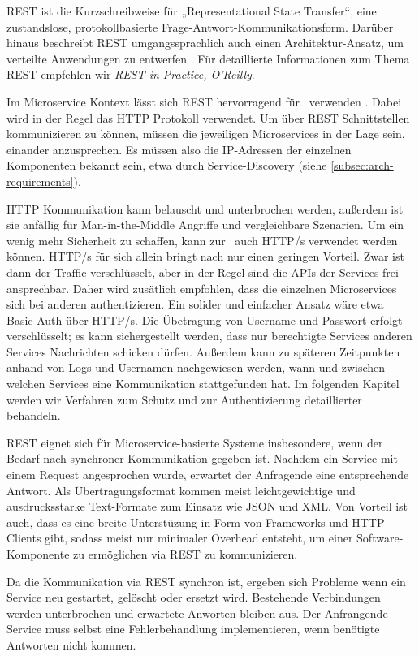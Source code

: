 REST ist die Kurzschreibweise für „Representational State Transfer“, eine zustandslose, protokollbasierte Frage-Antwort-Kommunikationsform. Darüber hinaus beschreibt REST umgangssprachlich auch einen Architektur-Ansatz, um verteilte Anwendungen zu entwerfen \cite{webber2010}. Für detaillierte Informationen zum Thema REST empfehlen wir \textit{REST in Practice, O'Reilly}.

Im Microservice Kontext lässt sich REST hervorragend für \stscom\ verwenden \cite{Fowler+14}. Dabei wird in der Regel das HTTP Protokoll verwendet. Um über REST Schnittstellen kommunizieren zu können, müssen die jeweiligen Microservices in der Lage sein, einander anzusprechen. Es müssen also die IP-Adressen der einzelnen Komponenten bekannt sein, etwa durch Service-Discovery (siehe \ref{subsec:arch-requirements}). 

HTTP Kommunikation kann belauscht und unterbrochen werden, außerdem ist sie anfällig für Man-in-the-Middle Angriffe und vergleichbare Szenarien. Um ein wenig mehr Sicherheit zu schaffen, kann zur \stscom\ auch HTTP/s verwendet werden können. HTTP/s für sich allein bringt nach \cite{newman2015} nur einen geringen Vorteil. Zwar ist dann der Traffic verschlüsselt, aber in der Regel sind die APIs der Services frei ansprechbar. Daher wird zusätlich empfohlen, dass die einzelnen Microservices sich bei anderen authentizieren. Ein solider und einfacher Ansatz wäre etwa Basic-Auth über HTTP/s. Die Übetragung von Username und Passwort erfolgt verschlüsselt; es kann sichergestellt werden, dass nur berechtigte Services anderen Services Nachrichten schicken dürfen. Außerdem kann zu späteren Zeitpunkten anhand von Logs und Usernamen nachgewiesen werden, wann und zwischen welchen Services eine Kommunikation stattgefunden hat. Im folgenden Kapitel werden wir Verfahren zum Schutz und zur Authentizierung detaillierter behandeln. 

REST eignet sich für Microservice-basierte Systeme insbesondere, wenn der Bedarf nach synchroner Kommunikation gegeben ist. Nachdem ein Service mit einem Request angesprochen wurde, erwartet der Anfragende eine entsprechende Antwort. Als Übertragungsformat kommen meist leichtgewichtige und ausdrucksstarke Text-Formate zum Einsatz wie JSON und XML. Von Vorteil ist auch, dass es eine breite Unterstüzung in Form von Frameworks und HTTP Clients gibt, sodass meist nur minimaler Overhead entsteht, um einer Software-Komponente zu ermöglichen via REST zu kommunizieren.

Da die Kommunikation via REST synchron ist, ergeben sich Probleme wenn ein Service neu gestartet, gelöscht oder ersetzt wird. Bestehende Verbindungen werden unterbrochen und erwartete Anworten bleiben aus. Der Anfrangende Service muss selbst eine Fehlerbehandlung implementieren, wenn benötigte Antworten nicht kommen. 

